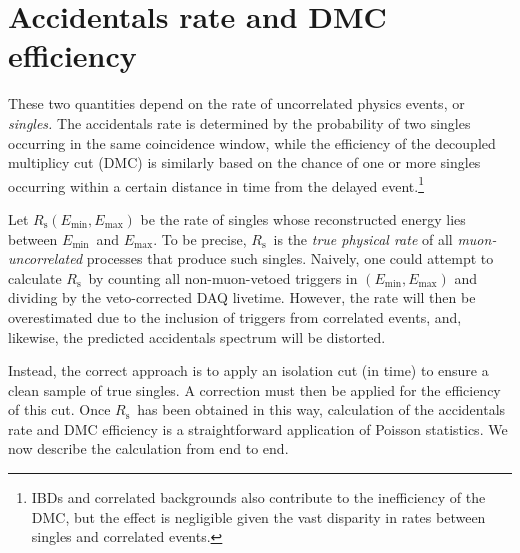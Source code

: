 \documentclass[../thesis.tex]{subfiles}
\begin{document}
\chapter{Accidentals rate and DMC efficiency}

\def\Emin{\ensuremath{E_\mathrm{min}}} \def\Emax{\ensuremath{E_\mathrm{max}}}
\def\Rs{\ensuremath{R_\mathrm{s}}} \def\Rplu{\ensuremath{R_\mathrm{+}}}
\def\Rpro{\ensuremath{R_\mathrm{p}}} \def\Rdel{\ensuremath{R_\mathrm{d}}}
\def\Rsub{\ensuremath{R_\mathrm{\lambda}}} \def\Nplu{\ensuremath{N_\mathrm{+}}}
\def\Npro{\ensuremath{N_\mathrm{p}}} \def\Ndel{\ensuremath{N_\mathrm{d}}}
\def\eisol{\ensuremath{\epsilon_\mathrm{i}}}
\def\emu{\ensuremath{\epsilon_\mathrm{\mu}}}
\def\etot{\ensuremath{\epsilon_\mathrm{tot}}}
\def\Racc{\ensuremath{R_\mathrm{acc}}}

These two quantities depend on the rate of uncorrelated physics events, or
\emph{singles.} The accidentals rate is determined by the probability of two
singles occurring in the same coincidence window, while the efficiency of the
decoupled multiplicy cut (DMC) is similarly based on the chance of one or more
singles occurring within a certain distance in time from the delayed
event.\footnote{IBDs and correlated backgrounds also contribute to the
  inefficiency of the DMC, but the effect is negligible given the vast disparity
  in rates between singles and correlated events.}

Let $\Rs(\Emin, \Emax)$ be the rate of singles whose reconstructed energy lies
between \Emin\ and \Emax. To be precise, \Rs\ is the \emph{true physical rate}
of all \emph{muon-uncorrelated} processes that produce such singles. Naively,
one could attempt to calculate \Rs\ by counting all non-muon-vetoed triggers in
$(\Emin, \Emax)$ and dividing by the veto-corrected DAQ livetime. However, the
rate will then be overestimated due to the inclusion of triggers from correlated
events, and, likewise, the predicted accidentals spectrum will be distorted.

Instead, the correct approach is to apply an isolation cut (in time) to ensure a
clean sample of true singles. A correction must then be applied for the
efficiency of this cut. Once \Rs\ has been obtained in this way, calculation of
the accidentals rate and DMC efficiency is a straightforward application of
Poisson statistics. We now describe the calculation from end to end.
\end{document}
